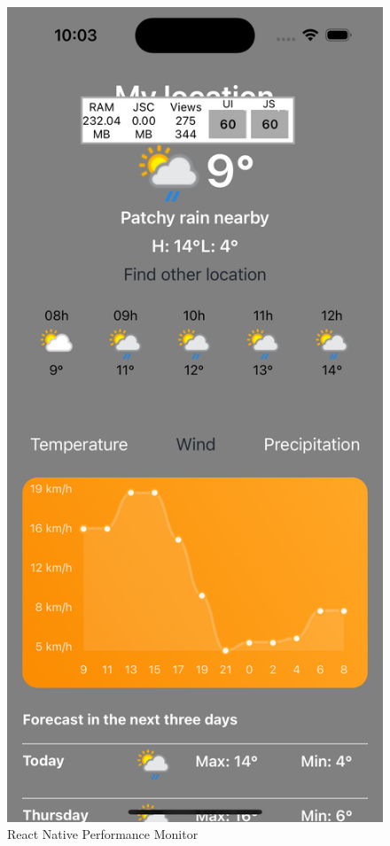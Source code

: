 \documentclass[12pt,oneside]{memoir}
\begin{document}
\begin{figure}[h]
    \centering
    \includegraphics[scale=0.1]{docs/images/chapterFive/reactNativePerfMonitor.png}
    \caption{React Native Performance Monitor}
    \label{fig:reactNativePerformanceMonitor}
\end{figure}
\end{document}
